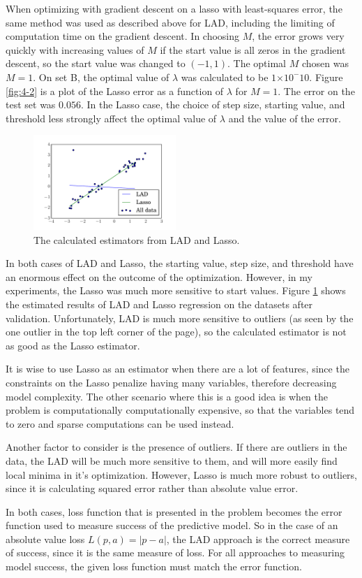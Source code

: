 \documentclass[10pt]{article}
\providecommand{\e}[1]{\ensuremath{\times 10^{#1}}}
\begin{document}
When optimizing with gradient descent on a lasso with least-squares error, the same method was used as described above for LAD, including the limiting of computation time on the gradient descent. In choosing $M$, the error grows very quickly with increasing values of $M$ if the start value is all zeros in the gradient descent, so the start value was changed to $(-1, 1)$. The optimal $M$ chosen was $M = 1$. On set B, the optimal value of $\lambda$ was calculated to be $1\e-10$. Figure \ref{fig:4-2} is a plot of the Lasso error as a function of $\lambda$ for $M = 1$. The error on the test set was $0.056$. In the Lasso case, the choice of step size, starting value, and threshold less strongly affect the optimal value of $\lambda$ and the value of the error. 

\begin{figure}[!ht]
	\begin{center}
	\includegraphics[width=0.48\textwidth]{exercise4-3.pdf}
	\caption{The calculated estimators from LAD and Lasso.}
	\label{fig:4-3}
	\end{center}
\end{figure}

In both cases of LAD and Lasso, the starting value, step size, and threshold have an enormous effect on the outcome of the optimization. However, in my experiments, the Lasso was much more sensitive to start values. Figure \ref{fig:4-3} shows the estimated results of LAD and Lasso regression on the datasets after validation. Unfortunately, LAD is much more sensitive to outliers (as seen by the one outlier in the top left corner of the page), so the calculated estimator is not as good as the Lasso estimator. 

It is wise to use Lasso as an estimator when there are a lot of features, since the constraints on the Lasso penalize having many variables, therefore decreasing model complexity. The other scenario where this is a good idea is when the problem is computationally computationally expensive, so that the variables tend to zero and sparse computations can be used instead. 

Another factor to consider is the presence of outliers. If there are outliers in the data, the LAD will be much more sensitive to them, and will more easily find local minima in it's optimization. However, Lasso is much more robust to outliers, since it is calculating squared error rather than absolute value error.

In both cases, loss function that is presented in the problem becomes the error function used to measure success of the predictive model. So in the case of an absolute value loss $L(p, a) = |p - a|$, the LAD approach is the correct measure of success, since it is the same measure of loss. For all approaches to measuring model success, the given loss function must match the error function. 
\end{document}
